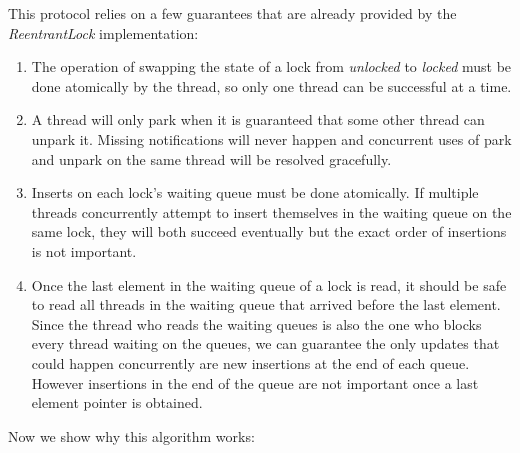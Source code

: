 This protocol relies on a few guarantees that are already provided by the \emph{ReentrantLock} implementation:
\begin{enumerate}
\item The operation of swapping the state of a lock from \emph{unlocked} to \emph{locked} must be done atomically by the thread, so only one thread can be successful at a time.
\item A thread will only park when it is guaranteed that some other thread can unpark it. Missing notifications will never happen and concurrent uses of park and unpark on the same thread will be resolved gracefully.
\item Inserts on each lock's waiting queue must be done atomically. If multiple threads concurrently attempt to insert themselves in the waiting queue on the same lock, they will both succeed eventually but the exact order of insertions is not important.
\item Once the last element in the waiting queue of a lock is read, it should be safe to read all threads in the waiting queue that arrived before the last element. Since the thread who reads the waiting queues is also the one who blocks every thread waiting on the queues, we can guarantee the only updates that could happen concurrently are new insertions at the end of each queue. However insertions in the end of the queue are not important once a last element pointer is obtained.
\end{enumerate}

Now we show why this algorithm works:

